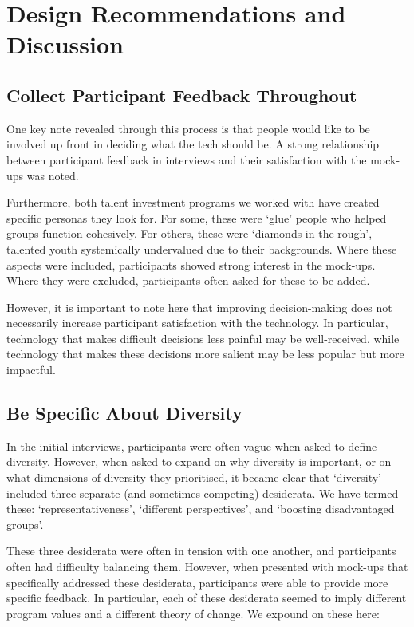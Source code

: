 \section{Design Recommendations and Discussion}
\subsection{Collect Participant Feedback Throughout}
One key note revealed through this process is that people would like to be involved up front in deciding what the tech should be. A strong relationship between participant feedback in interviews and their satisfaction with the mock-ups was noted.

Furthermore, both talent investment programs we worked with have created specific personas they look for. For some, these were `glue' people who helped groups function cohesively. For others, these were `diamonds in the rough', talented youth systemically undervalued due to their backgrounds. Where these aspects were included, participants showed strong interest in the mock-ups. Where they were excluded, participants often asked for these to be added.

However, it is important to note here that improving decision-making does not necessarily increase participant satisfaction with the technology. In particular, technology that makes difficult decisions less painful may be well-received, while technology that makes these decisions more salient may be less popular but more impactful.

\subsection{Be Specific About Diversity}
In the initial interviews, participants were often vague when asked to define diversity. However, when asked to expand on why diversity is important, or on what dimensions of diversity they prioritised, it became clear that `diversity' included three separate (and sometimes competing) desiderata. We have termed these: `representativeness', `different perspectives', and `boosting disadvantaged groups'. 

These three desiderata were often in tension with one another, and participants often had difficulty balancing them. However, when presented with mock-ups that specifically addressed these desiderata, participants were able to provide more specific feedback. In particular, each of these desiderata seemed to imply different program values and a different theory of change. We expound on these here:

